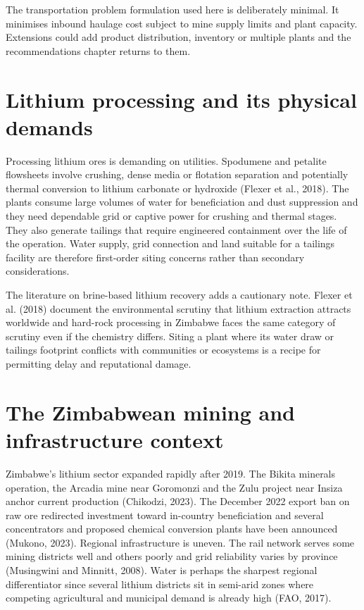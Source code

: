 \documentclass[12pt,a4paper]{report}
\begin{document}
The transportation problem formulation used here is deliberately
minimal. It minimises inbound haulage cost subject to mine supply
limits and plant capacity. Extensions could add product distribution,
inventory or multiple plants and the recommendations chapter returns
to them.

\section{Lithium processing and its physical demands}
Processing lithium ores is demanding on utilities. Spodumene and
petalite flowsheets involve crushing, dense media or flotation
separation and potentially thermal conversion to lithium carbonate or
hydroxide (Flexer et al., 2018). The plants consume large volumes of
water for beneficiation and dust suppression and they need dependable
grid or captive power for crushing and thermal stages. They also
generate tailings that require engineered containment over the life of
the operation. Water supply, grid connection and land suitable for a
tailings facility are therefore first-order siting concerns rather
than secondary considerations.

The literature on brine-based lithium recovery adds a cautionary note.
Flexer et al. (2018) document the environmental scrutiny that lithium
extraction attracts worldwide and hard-rock processing in Zimbabwe
faces the same category of scrutiny even if the chemistry differs.
Siting a plant where its water draw or tailings footprint conflicts
with communities or ecosystems is a recipe for permitting delay and
reputational damage.

\section{The Zimbabwean mining and infrastructure context}
Zimbabwe's lithium sector expanded rapidly after 2019. The Bikita
minerals operation, the Arcadia mine near Goromonzi and the Zulu
project near Insiza anchor current production (Chikodzi, 2023). The
December 2022 export ban on raw ore redirected investment toward
in-country beneficiation and several concentrators and proposed
chemical conversion plants have been announced (Mukono, 2023).
Regional infrastructure is uneven. The rail network serves some mining
districts well and others poorly and grid reliability varies by
province (Musingwini and Minnitt, 2008). Water is perhaps the sharpest
regional differentiator since several lithium districts sit in
semi-arid zones where competing agricultural and municipal demand is
already high (FAO, 2017).
\end{document}
